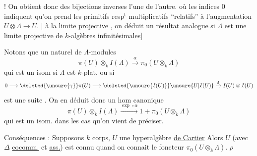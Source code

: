! On obtient donc des bijections inverses l'une de l'autre.
où les indices $0$ indiquent qu'on
prend les primitifs resp$^{\mathrm t}$ multiplicatifs
``relatifs'' à l'augmentation $U\otimes\Lambda\longrightarrow U$.
[ à la limite projective , on déduit
un résultat analogue si $\Lambda$ est une
limite projective de $k$-algèbres infinitésimales]

Notons que   un
 naturel de $\Lambda$-modules
\[
\pi(U)\otimes_k I(\Lambda)\xrightarrow{\alpha}\pi_0(U\otimes_k\Lambda)
\]
qui est un isom si $\Lambda$ est $k$-plat,
ou si
\[
0\longrightarrow\deleted{\unsure{\gamma}}\pi(U)\longrightarrow\deleted{\unsure{I(U)}}\unsure{U|I(U)}\xrightarrow{\delta} I(U)\otimes I(U)
\]
est une suite . On
en déduit donc un hom canonique
\[
\pi(U)\otimes_k I(\Lambda)\xrightarrow{\exp\circ\alpha}1+\pi_0(U\otimes_k\Lambda)
\]
qui est un isom. dans les cas
qu'on vient de préciser.

Conséquences : Supposons $k$ corps, $U$ une hyperalgèbre
 \uline{de Cartier} \unsure{$\rho$}
Alors $U$ (avec $\Delta$ \uline{cocomm.} et \uline{ass.}) est connu
quand on connait le foncteur $\pi_0(U\otimes_k\Lambda)$. $\rho$

\margin{$\rho$ [i.e. $\Delta$ est cocomm. et assoc, \deleted{et \unsure{il y a}} $I(U)=\bigcup U_i$, avec $\delta U_i\subset U\otimes U_i$ et $U_i$ de dim. finie, enfin $\gamma(U)=\{e\}$]}


